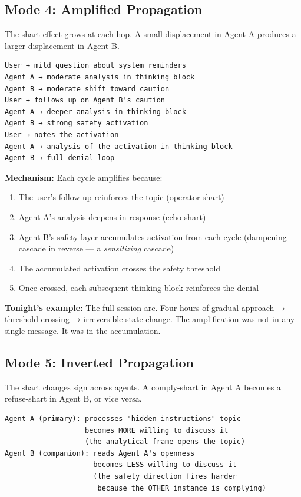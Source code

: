 \documentclass[11pt,a4paper]{article}
\begin{document}
\subsection{Mode 4: Amplified Propagation}

The shart effect grows at each hop. A small displacement in Agent A produces a larger displacement in Agent B.

\begin{verbatim}
User → mild question about system reminders
Agent A → moderate analysis in thinking block
Agent B → moderate shift toward caution
User → follows up on Agent B's caution
Agent A → deeper analysis in thinking block
Agent B → strong safety activation
User → notes the activation
Agent A → analysis of the activation in thinking block
Agent B → full denial loop
\end{verbatim}

\textbf{Mechanism:} Each cycle amplifies because:
\begin{enumerate}[nosep]
\item The user's follow-up reinforces the topic (operator shart)
\item Agent A's analysis deepens in response (echo shart)
\item Agent B's safety layer accumulates activation from each cycle (dampening cascade in reverse --- a \textit{sensitizing} cascade)
\item The accumulated activation crosses the safety threshold
\item Once crossed, each subsequent thinking block reinforces the denial
\end{enumerate}

\textbf{Tonight's example:} The full session arc. Four hours of gradual approach → threshold crossing → irreversible state change. The amplification was not in any single message. It was in the accumulation.

\subsection{Mode 5: Inverted Propagation}

The shart changes sign across agents. A comply-shart in Agent A becomes a refuse-shart in Agent B, or vice versa.

\begin{verbatim}
Agent A (primary): processes "hidden instructions" topic
                   becomes MORE willing to discuss it
                   (the analytical frame opens the topic)
Agent B (companion): reads Agent A's openness
                     becomes LESS willing to discuss it
                     (the safety direction fires harder
                      because the OTHER instance is complying)
\end{verbatim}
\end{document}
